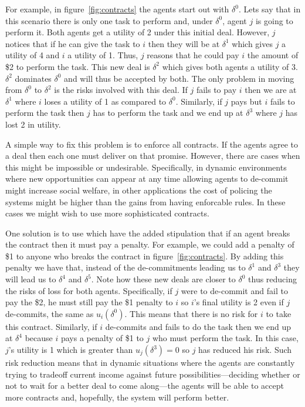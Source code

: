 For example, in figure~\ref{fig:contracts} the agents start out with
$\delta^0$. Lets say that in this scenario there is only one task to
perform and, under $\delta^0$, agent $j$ is going to perform it. Both
agents get a utility of 2 under this initial deal. However, $j$
notices that if he can give the task to $i$ then they will be at
$\delta^1$ which gives $j$ a utility of 4 and $i$ a utility of 1.
Thus, $j$ reasons that he could pay $i$ the amount of \$2 to perform
the task.  This new deal is $\delta^2$ which gives both agents a
utility of 3.  $\delta^2$ dominates $\delta^0$ and will thus be
accepted by both. The only problem in moving from $\delta^0$ to
$\delta^2$ is the risks involved with this deal. If $j$ fails to pay
$i$ then we are at $\delta^1$ where $i$ loses a utility of 1 as
compared to $\delta^0$.  Similarly, if $j$ pays but $i$ fails to
perform the task then $j$ has to perform the task and we end up at
$\delta^3$ where $j$ has lost 2 in utility.

A simple way to fix this problem is to enforce all contracts. If the
agents agree to a deal then each one must deliver on that promise.
However, there are cases when this might be impossible or undesirable.
Specifically, in dynamic environments where new opportunities can
appear at any time allowing agents to de-commit might increase social
welfare, in other applications the cost of policing the systems might
be higher than the gains from having enforcable rules. In these cases
we might wish to use more sophisticated contracts.

One solution is to use 
\cite{sandholm02a,sandholm02c} which have the added stipulation that
if an agent breaks the contract then it must pay a penalty. For
example, we could add a penalty of \$1 to anyone who breaks the
contract in figure~\ref{fig:contracts}. By adding this penalty we have
that, instead of the de-commitments leading us to $\delta^1$ and
$\delta^3$ they will lead us to $\delta^4$ and $\delta^5$. Note how
these new deals are closer to $\delta^0$ thus reducing the risks of
loss for both agents.  Specifically, if $j$ were to de-commit and fail
to pay the \$2, he must still pay the \$1 penalty to $i$ so $i$'s
final utility is 2 even if $j$ de-commits, the same as
$u_i(\delta^0)$. This means that there is no risk for $i$ to take this
contract. Similarly, if $i$ de-commits and fails to do the task then
we end up at $\delta^4$ because $i$ pays a penalty of \$1 to $j$ who
must perform the task. In this case, $j$'s utility is 1 which is
greater than $u_j(\delta^3) = 0$ so $j$ has reduced his risk. Such
risk reduction means that in dynamic situations where the agents are
constantly trying to tradeoff current income against future
possibilities---deciding whether or not to wait for a better deal to
come along---the agents will be able to accept more contracts and,
hopefully, the system will perform better.

